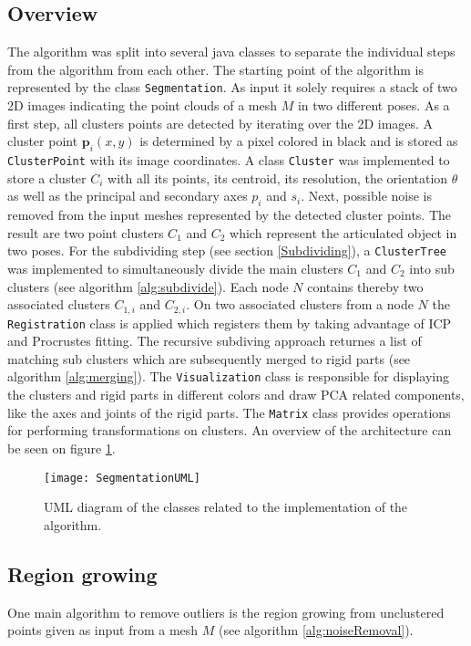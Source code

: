 \subsection{Overview}
The algorithm was split into several java classes to separate the individual steps from the algorithm from each other. The starting point of the algorithm is represented by the class \texttt{Segmentation}. As input it solely requires a stack of two 2D images indicating the point clouds of a mesh $M$ in two different poses. As a first step, all clusters points are detected by iterating over the 2D images. A cluster point $\boldsymbol{p}_i(x,y)$ is determined by a pixel colored in black and is stored as \texttt{ClusterPoint} with its image coordinates. A class \texttt{Cluster} was implemented to store a cluster $C_i$ with all its points, its centroid, its resolution, the orientation $\theta$ as well as the principal and secondary axes $p_i$ and $s_i$. Next, possible noise is removed from the input meshes represented by the detected  cluster points. The result are two point clusters $C_1$ and $C_2$ which represent the articulated object in two poses. For the subdividing step (see section \ref{Subdividing}), a \texttt{ClusterTree} was implemented to simultaneously divide the main clusters $C_1$ and $C_2$ into sub clusters (see algorithm \ref{alg:subdivide}). Each node $N$ contains thereby two associated clusters $C_{1,i}$ and $C_{2,i}$. On two associated clusters from a node $N$ the \texttt{Registration} class is applied which registers them by taking advantage of ICP and Procrustes fitting. The recursive subdiving approach returnes a list of matching sub clusters which are subsequently merged to rigid parts (see algorithm \ref{alg:merging}). The \texttt{Visualization} class is responsible for displaying the clusters and rigid parts in different colors and draw PCA related components, like the axes and joints of the rigid parts. The \texttt{Matrix} class provides operations for performing transformations on clusters. An overview of the architecture can be seen on figure \ref{fig:UML}.
\begin{figure} [H]
	\centering
	\texttt{[image: SegmentationUML]}
	\caption{UML diagram of the classes related to the implementation of the algorithm.}
	\label{fig:UML}
\end{figure}

\subsection{Region growing}
\label{RegionGrowing}
One main algorithm to remove outliers is the region growing from unclustered points given as input from a mesh $M$ (see algorithm \ref{alg:noiseRemoval}).

